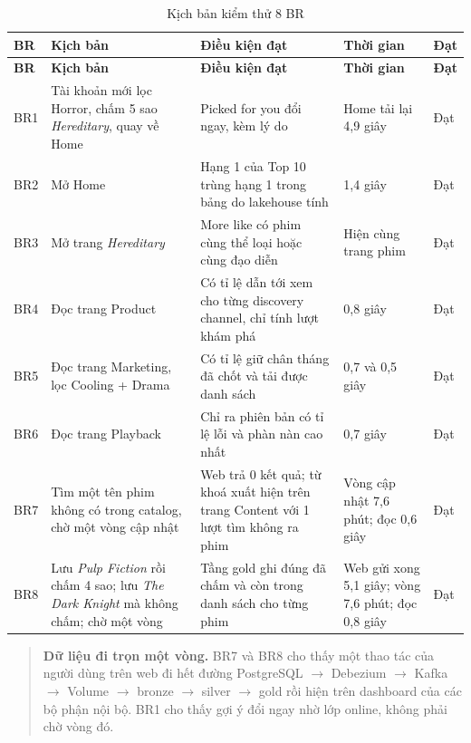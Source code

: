 \documentclass[a4paper,11pt]{article}
\newlength{\reporttablewidth}
\begin{document}
\begingroup
\footnotesize
{}
\setlength{\tabcolsep}{4pt}
\renewcommand{\arraystretch}{1.18}
\setlength{\reporttablewidth}{\dimexpr\linewidth-8\tabcolsep\relax}
\begin{longtable}{@{}L{0.07\reporttablewidth} L{0.31\reporttablewidth} L{0.41\reporttablewidth} L{0.13\reporttablewidth} L{0.08\reporttablewidth}@{}}
\caption[Kịch bản kiểm thử 8 BR (mục 5.4)]{Kịch bản kiểm thử 8 BR}\label{tab:19} \\
\toprule
\textbf{BR} & \textbf{Kịch bản} & \textbf{Điều kiện đạt} & \textbf{Thời gian} & \textbf{Đạt} \\
\midrule
\endfirsthead
\toprule
\textbf{BR} & \textbf{Kịch bản} & \textbf{Điều kiện đạt} & \textbf{Thời gian} & \textbf{Đạt} \\
\midrule
\endhead
\midrule
\endfoot
\bottomrule
\endlastfoot
BR1 & Tài khoản mới lọc Horror, chấm 5 sao \textit{Hereditary}, quay về Home & \textquotedbl{}Picked for you\textquotedbl{} đổi ngay, kèm lý do & Home tải lại 4,9 giây & Đạt \\
BR2 & Mở Home & Hạng 1 của Top 10 trùng hạng 1 trong bảng do lakehouse tính & 1,4 giây & Đạt \\
BR3 & Mở trang \textit{Hereditary} & \textquotedbl{}More like\textquotedbl{} có phim cùng thể loại hoặc cùng đạo diễn & Hiện cùng trang phim & Đạt \\
BR4 & Đọc trang Product & Có tỉ lệ dẫn tới xem cho từng discovery channel, chỉ tính lượt khám phá & 0,8 giây & Đạt \\
BR5 & Đọc trang Marketing, lọc Cooling + Drama & Có tỉ lệ giữ chân tháng đã chốt và tải được danh sách & 0,7 và 0,5 giây & Đạt \\
BR6 & Đọc trang Playback & Chỉ ra phiên bản có tỉ lệ lỗi và phàn nàn cao nhất & 0,7 giây & Đạt \\
BR7 & Tìm một tên phim không có trong catalog, chờ một vòng cập nhật & Web trả 0 kết quả; từ khoá xuất hiện trên trang Content với 1 lượt tìm không ra phim & Vòng cập nhật 7,6 phút; đọc 0,6 giây & Đạt \\
BR8 & Lưu \textit{Pulp Fiction} rồi chấm 4 sao; lưu \textit{The Dark Knight} mà không chấm; chờ một vòng & Tầng gold ghi đúng \textquotedbl{}đã chấm\textquotedbl{} và \textquotedbl{}còn trong danh sách\textquotedbl{} cho từng phim & Web gửi xong 5,1 giây; vòng 7,6 phút; đọc 0,8 giây & Đạt \\
\end{longtable}
\endgroup

\begin{quote}
\textbf{Dữ liệu đi trọn một vòng.} BR7 và BR8 cho thấy một thao tác của người dùng trên web đi hết đường PostgreSQL \ensuremath{\rightarrow} Debezium \ensuremath{\rightarrow} Kafka \ensuremath{\rightarrow} Volume \ensuremath{\rightarrow} bronze \ensuremath{\rightarrow} silver \ensuremath{\rightarrow} gold rồi hiện trên dashboard của các bộ phận nội bộ. BR1 cho thấy gợi ý đổi ngay nhờ lớp online, không phải chờ vòng đó.
\end{quote}
\end{document}
